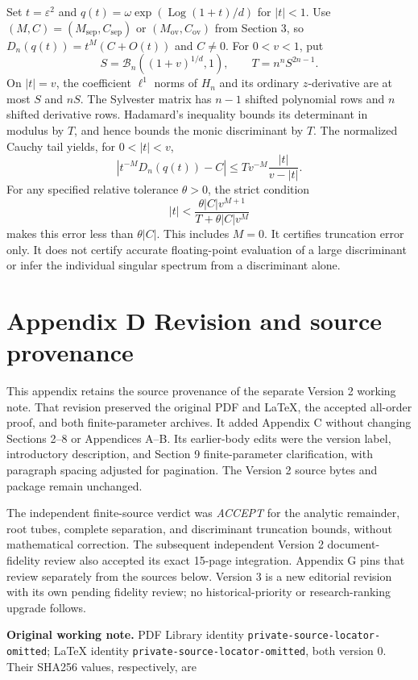 \documentclass[
  11pt,
]{article}
\begin{document}
Set \(t=\varepsilon^2\) and
\(q(t)=\omega\exp(\operatorname{Log}(1+t)/d)\) for \(|t|<1\).
Use \((M,C)=(M_{\mathrm{sep}},C_{\mathrm{sep}})\) or
\((M_{\mathrm{ov}},C_{\mathrm{ov}})\) from Section 3, so
\(D_n(q(t))=t^M(C+O(t))\) and \(C\ne0\). For \(0<v<1\), put
\[
S=\mathcal B_n((1+v)^{1/d},1),\qquad T=n^nS^{2n-1}.
\]
On \(|t|=v\), the coefficient \(\ell^1\) norms of \(H_n\) and
its ordinary \(z\)-derivative are at most \(S\) and \(nS\).
The Sylvester matrix has \(n-1\) shifted polynomial rows and \(n\)
shifted derivative rows. Hadamard's inequality bounds its determinant
in modulus by \(T\), and hence bounds the monic discriminant by
\(T\). The normalized Cauchy tail yields, for \(0<|t|<v\),
\[
|t^{-M}D_n(q(t))-C|\leq T v^{-M}\frac{|t|}{v-|t|}. \tag{C16}
\]
For any specified relative tolerance \(\theta>0\), the strict condition
\[
|t|<\frac{\theta|C|v^{M+1}}{T+\theta|C|v^M} \tag{C17}
\]
makes this error less than \(\theta|C|\). This includes \(M=0\).
It certifies truncation error only. It does not certify accurate
floating-point evaluation of a large discriminant or infer the
individual singular spectrum from a discriminant alone.

\clearpage
\section{Appendix D Revision and source provenance}

This appendix retains the source provenance of the separate Version 2
working note. That revision preserved the original PDF and LaTeX, the
accepted all-order proof, and both finite-parameter archives. It added
Appendix C without changing Sections 2--8 or Appendices A--B. Its earlier-body
edits were the version label, introductory description, and Section 9
finite-parameter clarification, with paragraph spacing adjusted for
pagination. The Version 2 source bytes and package remain unchanged.

The independent finite-source verdict was \emph{ACCEPT} for the analytic
remainder, root tubes, complete separation, and discriminant truncation
bounds, without mathematical correction. The subsequent independent
Version 2 document-fidelity review also accepted its exact 15-page
integration. Appendix G pins that review separately from the sources
below. Version 3 is a new editorial revision with its own pending fidelity
review; no historical-priority or research-ranking upgrade follows.

\textbf{Original working note.} PDF Library identity
\nolinkurl{private-source-locator-omitted}; LaTeX identity
\nolinkurl{private-source-locator-omitted}, both version 0.
Their SHA256 values, respectively, are
\end{document}
